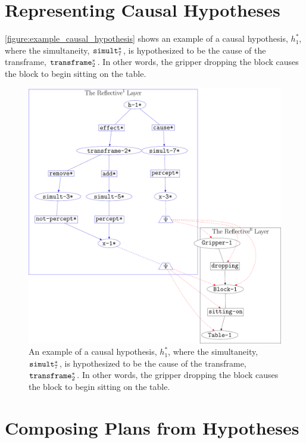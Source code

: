 \section{Representing Causal Hypotheses}

{\mbox{\autoref{figure:example_causal_hypothesis}}} shows an example
of a causal hypothesis, $h_1^*$, where the simultaneity,
$\text{\tt{simult}}_7^*$, is hypothesized to be the cause of the
transframe, $\text{\tt{transframe}}_2^*$.  In other words, the gripper
dropping the block causes the block to begin sitting on the table.
\begin{figure}
\center
\includegraphics[width=12cm]{gfx/example_causal_hypothesis}
\caption[An example of a causal hypothesis.]{An example of a causal
  hypothesis, $h_1^*$, where the simultaneity,
  $\text{\tt{simult}}_7^*$, is hypothesized to be the cause of the
  transframe, $\text{\tt{transframe}}_2^*$.  In other words, the
  gripper dropping the block causes the block to begin sitting on the
  table.}
\label{figure:example_causal_hypothesis}
\end{figure}

\section{Composing Plans from Hypotheses}

